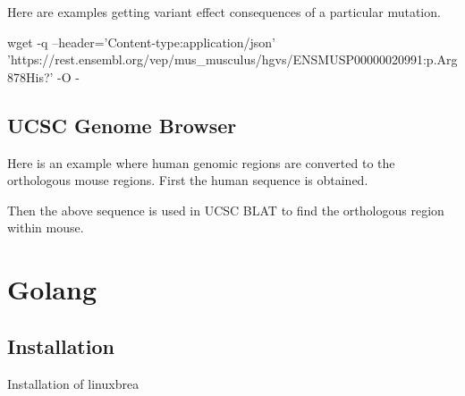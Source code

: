 \documentclass[]{book}
\newenvironment{Shaded}{\begin{snugshade}}{\end{snugshade}}
\newcommand{\FunctionTok}[1]{\textcolor[rgb]{0.00,0.00,0.00}{#1}}
\newcommand{\NormalTok}[1]{#1}
\newcommand{\OperatorTok}[1]{\textcolor[rgb]{0.81,0.36,0.00}{\textbf{#1}}}
\newcommand{\StringTok}[1]{\textcolor[rgb]{0.31,0.60,0.02}{#1}}
\begin{document}
Here are examples getting variant effect consequences of a particular mutation.

\begin{Shaded}
\begin{Highlighting}[]
\FunctionTok{wget}\NormalTok{ -q --header=}\StringTok{'Content-type:application/json'} \StringTok{'https://rest.ensembl.org/vep/mus_musculus/hgvs/ENSMUSP00000020991:p.Arg878His?'}\NormalTok{  -O -}
\end{Highlighting}
\end{Shaded}

\hypertarget{ucsc-genome-browser-1}{%
\section{UCSC Genome Browser}\label{ucsc-genome-browser-1}}

Here is an example where human genomic regions are converted to the orthologous mouse regions. First the human sequence is obtained.

\begin{Shaded}
\end{Shaded}

Then the above sequence is used in UCSC BLAT to find the orthologous region within mouse.

\hypertarget{golang}{%
\chapter{Golang}\label{golang}}

\hypertarget{installation}{%
\section{Installation}\label{installation}}

Installation of linuxbrea
\end{document}
